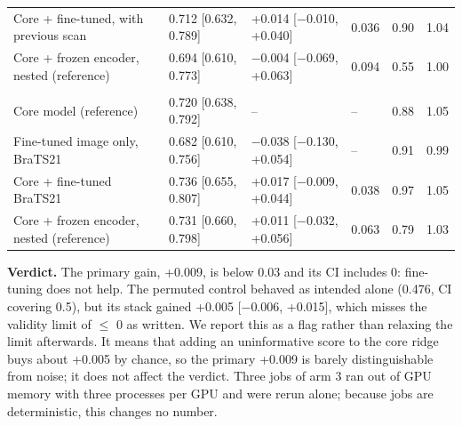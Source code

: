 \documentclass[11pt,a4paper]{article}
\begin{document}
\begin{table}[H]
\begin{tabularx}{\linewidth}{@{}L R{2.6cm} R{2.9cm} R{1.0cm} R{1.0cm} R{0.8cm}@{}}
Core + fine-tuned, with previous scan & 0.712 [0.632, 0.789] & +0.014 [$-$0.010, +0.040] & 0.036 & 0.90 & 1.04 \\
Core + frozen encoder, nested (reference) & 0.694 [0.610, 0.773] & $-$0.004 [$-$0.069, +0.063] & 0.094 & 0.55 & 1.00 \\
\addlinespace
{} \\
Core model (reference) & 0.720 [0.638, 0.792] & -- & -- & 0.88 & 1.05 \\
Fine-tuned image only, BraTS21 & 0.682 [0.610, 0.756] & $-$0.038 [$-$0.130, +0.054] & -- & 0.91 & 0.99 \\
Core + fine-tuned BraTS21 & 0.736 [0.655, 0.807] & +0.017 [$-$0.009, +0.044] & 0.038 & 0.97 & 1.05 \\
Core + frozen encoder, nested (reference) & 0.731 [0.660, 0.798] & +0.011 [$-$0.032, +0.056] & 0.063 & 0.79 & 1.03 \\
\bottomrule
\end{tabularx}
\end{table}

\textbf{Verdict.} The primary gain, +0.009, is below 0.03 and its CI includes 0: fine-tuning does not help. The
permuted control behaved as intended alone (0.476, CI covering 0.5), but its stack gained +0.005 [$-$0.006, +0.015],
which misses the validity limit of $\leq$ 0 as written. We report this as a flag rather than relaxing the limit
afterwards. It means that adding an uninformative score to the core ridge buys about +0.005 by chance, so the primary
+0.009 is barely distinguishable from noise; it does not affect the verdict. Three jobs of arm 3 ran out of GPU memory
with three processes per GPU and were rerun alone; because jobs are deterministic, this changes no number.
\end{document}
